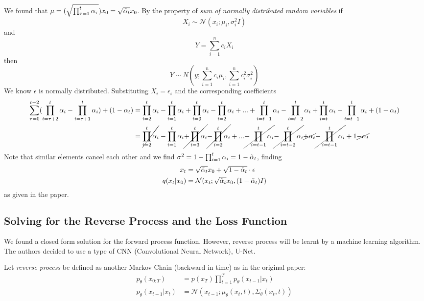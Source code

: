 \documentclass{article}
\numberwithin{equation}{subsection}
\begin{document}
We found that $\mu = (\sqrt{\prod_{\tau=1}^{t}\alpha_\tau})x_0 = \sqrt{\Tilde{\alpha}_t}x_0$. By the property of \textit{sum of normally distributed random variables} if 
\begin{equation}
    X_i \sim \mathcal{N}(x_i; \mu_i, \sigma_i^2 I)
\end{equation}
and
\begin{equation}
    Y = \sum_{i=1}^{n}c_iX_i
\end{equation}
then
\begin{equation}
    Y \sim N(y; \sum_{i=1}^{n}c_i\mu_i,\sum_{i=1}^{n}c_i^2\sigma_i^2)
\end{equation}
We know $\epsilon$ is normally distributed. Substituting $X_i = \epsilon_i$ and the corresponding coefficients 
\begin{align}
    \sum_{\tau=0}^{t-2}(\prod_{i=\tau+2}^{t}\alpha_i-\prod_{i=\tau+1}^{t}\alpha_i)+(1-\alpha_t) &= \prod_{i=2}^{t}\alpha_i-\prod_{i=1}^{t}\alpha_i+\prod_{i=3}^{t}\alpha_i-\prod_{i=2}^{t}\alpha_i+...+\prod_{i=t-1}^{t}\alpha_i-\prod_{i=t-2}^{t}\alpha_i+\prod_{i=t}^{t}\alpha_i-\prod_{i=t-1}^{t}\alpha_i+(1-\alpha_t)\\
    &= \cancel{\prod_{i=2}^{t}\alpha_i}-\prod_{i=1}^{t}\alpha_i\cancel{+\prod_{i=3}^{t}\alpha_i}\cancel{-\prod_{i=2}^{t}\alpha_i}+...\cancel{+\prod_{i=t-1}^{t}\alpha_i}\cancel{-\prod_{i=t-2}^{t}\alpha_i}\cancel{+\alpha_t}\cancel{-\prod_{i=t-1}^{t}\alpha_i}+1\cancel{-\alpha_t}
\end{align}
Note that similar elements cancel each other and we find $\sigma^2 = 1-\prod_{i=1}^{t}\alpha_i = 1 - \Tilde{\alpha}_t$, finding 
\begin{align}
    x_t &= \sqrt{\Tilde{\alpha}_t}x_0 + \sqrt{1 - \Tilde{\alpha}_t} \cdot \epsilon\\
    q(x_t|x_0) &= \mathcal{N}(x_t;\sqrt{\Tilde{\alpha}_t}x_0,(1 - \Tilde{\alpha}_t)I)
\end{align}
as given in the paper.
\subsection{Solving for the Reverse Process and the Loss Function}


We found a closed form solution for the forward process function. However, reverse process will be learnt by a machine learning algorithm. The authors decided to use a type of CNN (Convolutional Neural Network), U-Net.

Let \textit{reverse process} be defined as another Markov Chain (backward in time) as in the original paper:
\begin{align}
    p_\theta(x_{0:T}) &= p(x_T)\prod_{t=1}^T p_\theta(x_{t-1}|x_t)\\
    p_\theta(x_{t-1}|x_t) &= \mathcal{N}(x_{t-1}; \mu_\theta(x_t, t), \Sigma_\theta(x_t,t))
\end{align}
\end{document}
